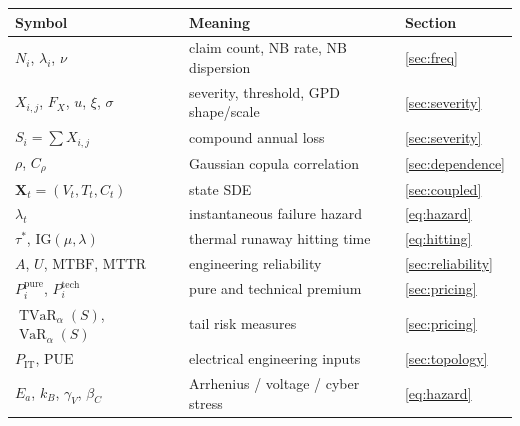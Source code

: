 \documentclass[11pt,a4paper]{article}
\theoremstyle{ia}
\newcommand{\1}{\mathbf{1}}
\newcommand{\VaR}{\operatorname{VaR}}
\newcommand{\TVaR}{\operatorname{TVaR}}
\begin{document}
\begin{table}[ht]
\centering\footnotesize
\begin{tabular}{lll}
\toprule
Symbol & Meaning & Section \\
\midrule
$N_i$, $\lambda_i$, $\nu$ & claim count, NB rate, NB dispersion & \ref{sec:freq} \\
$X_{i,j}$, $F_X$, $u$, $\xi$, $\sigma$ & severity, threshold, GPD shape/scale & \ref{sec:severity} \\
$S_i = \sum X_{i,j}$       & compound annual loss             & \ref{sec:severity} \\
$\rho$, $C_\rho$           & Gaussian copula correlation       & \ref{sec:dependence} \\
$\mathbf{X}_t=(V_t,T_t,C_t)$ & state SDE                       & \ref{sec:coupled} \\
$\lambda_t$                & instantaneous failure hazard      & \eqref{eq:hazard} \\
$\tau^*$, $\mathrm{IG}(\mu,\lambda)$ & thermal runaway hitting time & \eqref{eq:hitting} \\
$A$, $U$, $\mathrm{MTBF}$, $\mathrm{MTTR}$ & engineering reliability & \ref{sec:reliability} \\
$P^{\mathrm{pure}}_i$, $P^{\mathrm{tech}}_i$ & pure and technical premium & \ref{sec:pricing} \\
$\TVaR_\alpha(S)$, $\VaR_\alpha(S)$ & tail risk measures        & \ref{sec:pricing} \\
$P_{\mathrm{IT}}$, $\mathrm{PUE}$    & electrical engineering inputs & \ref{sec:topology} \\
$E_a$, $k_B$, $\gamma_V$, $\beta_C$  & Arrhenius / voltage / cyber stress & \eqref{eq:hazard} \\
\bottomrule
\end{tabular}
\end{table}


\end{document}
